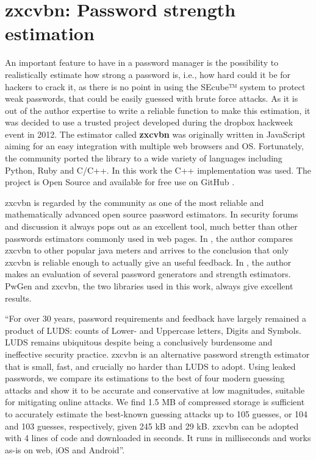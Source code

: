 \section{zxcvbn: Password strength estimation} \label{sec:zxcvbnth}

An important feature to have in a password manager is the possibility to realistically estimate how strong a password is, i.e., how hard could it be for hackers to crack it, as there is no point in using the SEcube™ system to protect weak passwords, that could be easily guessed with brute force attacks. As it is out of the author expertise to write a reliable function to make this estimation, it was decided to use a trusted project developed during the dropbox hackweek event in 2012. The estimator called \textbf{zxcvbn} was originally written in JavaScript aiming for an easy integration with multiple web browsers and OS. Fortunately, the community ported the library to a wide variety of languages including Python, Ruby and C/C++. In this work the C++ implementation was used. The project is Open Source and available for free use on GitHub \cite{zxgit}.

zxcvbn is regarded by the community as one of the most reliable and mathematically advanced open source password estimators. In security forums and discussion it always pops out as an excellent tool, much better than other passwords estimators commonly used in web pages. In \cite{naked}, the author compares zxcvbn to other popular java meters and arrives to the conclusion that only zxcvbn is reliable enough to actually give an useful feedback.
In \cite{gen_est_eval}, the author makes an evaluation of several password generators and strength estimators. PwGen and zxcvbn, the two libraries used in this work, always give excellent results.

``For over 30 years, password requirements and feedback have largely remained a product of LUDS: counts of Lower- and Uppercase letters, Digits and Symbols. LUDS remains ubiquitous despite being a conclusively burdensome and ineffective security practice. zxcvbn is an alternative password strength estimator that is small, fast, and crucially no harder than LUDS to adopt. Using leaked passwords, we compare its estimations to the best of four modern guessing attacks and show it to be accurate and conservative at low magnitudes, suitable for mitigating online attacks. We find 1.5 MB of compressed storage is sufficient to accurately estimate the best-known guessing attacks up to 105 guesses, or 104 and 103 guesses, respectively, given 245 kB and 29 kB. zxcvbn can be adopted with 4 lines of code and downloaded in seconds. It runs in milliseconds and works as-is on web, iOS and Android''. \cite{zxpaper}


